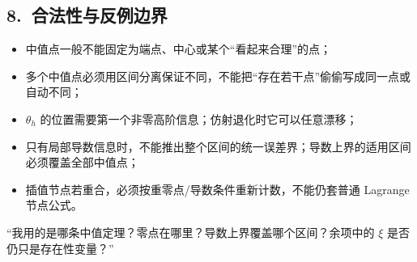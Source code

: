 \documentclass[UTF8,a4paper,10pt]{ctexart}
\begin{document}
\subsection*{8.\ 合法性与反例边界}
\begin{itemize}
\item 中值点一般不能固定为端点、中心或某个“看起来合理”的点；
\item 多个中值点必须用区间分离保证不同，不能把“存在若干点”偷偷写成同一点或自动不同；
\item $\theta_h$ 的位置需要第一个非零高阶信息；仿射退化时它可以任意漂移；
\item 只有局部导数信息时，不能推出整个区间的统一误差界；导数上界的适用区间必须覆盖全部中值点；
\item 插值节点若重合，必须按重零点/导数条件重新计数，不能仍套普通 Lagrange 节点公式。
\end{itemize}
\begin{tcolorbox}[title=检查句]
“我用的是哪条中值定理？零点在哪里？导数上界覆盖哪个区间？余项中的 $\xi$ 是否仍只是存在性变量？”
\end{tcolorbox}
\end{document}
